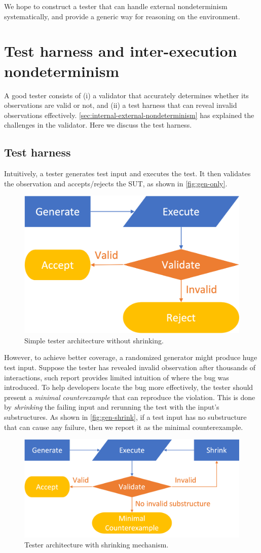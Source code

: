 We hope to construct a tester that can handle external nondeterminism
systematically, and provide a generic way for reasoning on the environment.

\section{Test harness and inter-execution nondeterminism}
\label{sec:inter-execution-nondeterminism}
A good tester consists of (i) a validator that accurately determines whether its
observations are valid or not, and (ii) a test harness that can reveal invalid
observations effectively.  \autoref{sec:internal-external-nondeterminism} has
explained the challenges in the validator.  Here we discuss the test harness.

\subsection{Test harness}
Intuitively, a tester generates test input and executes the test.  It then
validates the observation and accepts/rejects the SUT, as shown in
\autoref{fig:gen-only}.
\begin{figure}
  \includegraphics[width=.5\linewidth]{figures/gen-only}
  \caption{Simple tester architecture without shrinking.}
  \label{fig:gen-only}
\end{figure}

However, to achieve better coverage, a randomized generator might produce huge
test input.  Suppose the tester has revealed invalid observation after thousands
of interactions, such report provides limited intuition of where the bug was
introduced.  To help developers locate the bug more effectively, the tester
should present a {\em minimal counterexample} that can reproduce the violation.
This is done by {\em shrinking} the failing input and rerunning the test with
the input's substructures.  As shown in \autoref{fig:gen-shrink}, if a test
input has no substructure that can cause any failure, then we report it as the
minimal counterexample.
\begin{figure}
  \includegraphics[width=.8\linewidth]{figures/gen-shrink}
  \caption{Tester architecture with shrinking mechanism.}
  \label{fig:gen-shrink}
\end{figure}

